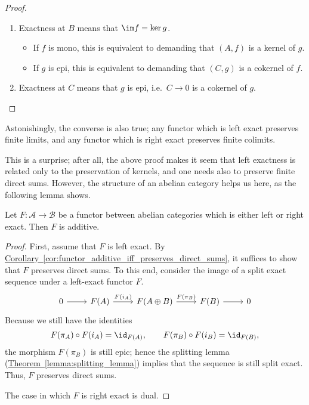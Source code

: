 \documentclass[main.tex]{subfiles}
\begin{document}
\begin{proof}
\begin{enumerate}
    \item Exactness at $B$ means that $\im f = \ker g$.
      \begin{itemize}
        \item If $f$ is mono, this is equivalent to demanding that $(A, f)$ is a kernel of $g$.

        \item If $g$ is epi, this is equivalent to demanding that $(C, g)$ is a cokernel of $f$.
      \end{itemize}

    \item Exactness at $C$ means that $g$ is epi, i.e.\ $C \to 0$ is a cokernel of $g$.
  \end{enumerate}
\end{proof}

Astonishingly, the converse is also true; any functor which is left exact preserves finite limits, and any functor which is right exact preserves finite colimits.

This is a surprise; after all, the above proof makes it seem that left exactness is related only to the preservation of kernels, and one needs also to preserve finite direct sums. However, the structure of an abelian category helps us here, as the following lemma shows.

\begin{lemma}
  Let $F\colon \mathcal{A} \to \mathcal{B}$ be a functor between abelian categories which is either left or right exact. Then $F$ is additive.
\end{lemma}
\begin{proof}
  First, assume that $F$ is left exact. By \hyperref[cor:functor_additive_iff_preserves_direct_sums]{Corollary~\ref*{cor:functor_additive_iff_preserves_direct_sums}}, it suffices to show that $F$ preserves direct sums. To this end, consider the image of a split exact sequence under a left-exact functor $F$.
  \begin{equation*}
    \begin{tikzcd}
      0
      \arrow[r]
      & F(A)
      \arrow[r, "F(i_{A})"]
      & F(A \oplus B)
      \arrow[r, "F(\pi_{B})"]
      & F(B)
      \arrow[r]
      & 0
    \end{tikzcd}
  \end{equation*}
  Because we still have the identities
  \begin{equation*}
    F(\pi_{A}) \circ F(i_{A}) = \id_{F(A)},\qquad F(\pi_{B}) \circ F(i_{B}) = \id_{F(B)},
  \end{equation*}
  the morphism $F(\pi_{B})$ is still epic; hence the splitting lemma (\hyperref[lemma:splitting_lemma]{Theorem~\ref*{lemma:splitting_lemma}}) implies that the sequence is still split exact. Thus, $F$ preserves direct sums.

  The case in which $F$ is right exact is dual.
\end{proof}
\end{document}
